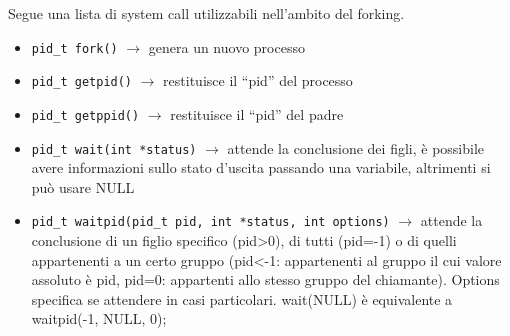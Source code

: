\documentclass[11pt]{article}
\begin{document}
Segue una lista di system call utilizzabili nell'ambito del forking.
\begin{itemize}
\item \verb|pid_t fork()| $\rightarrow$ genera un nuovo processo
\item \verb|pid_t getpid()| $\rightarrow$ restituisce il “pid” del processo
\item \verb|pid_t getppid()| $\rightarrow$ restituisce il “pid” del padre
\item \verb|pid_t wait(int *status)| $\rightarrow$ attende la conclusione dei figli, è possibile avere informazioni sullo stato d’uscita passando una variabile, altrimenti si può usare NULL
\item \verb|pid_t waitpid(pid_t pid, int *status, int options)| $\rightarrow$ attende la conclusione di un figlio specifico (pid>0), di tutti (pid=-1) o di quelli appartenenti a un certo gruppo (pid<-1: appartenenti al gruppo il cui valore assoluto è pid, pid=0: appartenti allo stesso gruppo del chiamante). Options specifica se attendere in casi particolari. wait(NULL) è equivalente a waitpid(-1, NULL, 0);
\end{itemize}
\end{document}
